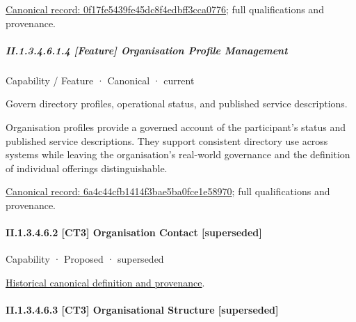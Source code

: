 {\footnotesize \href{../../../../continuum/strategy/capability/feature/0f17fe5439fe45dc8f4edbff3cca0776.md}{Canonical record: 0f17fe5439fe45dc8f4edbff3cca0776}; full qualifications and provenance.}\par
\subparagraph*{II.1.3.4.6.1.4 [Feature] Organisation Profile Management}
\label{navigation:II.1.3.4.6.1.4}

\label{element:6a4c44cfb1414f3bae5ba0fce1e58970}
{\small Capability / Feature · Canonical · current}\par

Govern directory profiles, operational status, and published service descriptions.



Organisation profiles provide a governed account of the participant's status and published service descriptions. They support consistent directory use across systems while leaving the organisation's real-world governance and the definition of individual offerings distinguishable.


{\footnotesize \href{../../../../continuum/strategy/capability/feature/6a4c44cfb1414f3bae5ba0fce1e58970.md}{Canonical record: 6a4c44cfb1414f3bae5ba0fce1e58970}; full qualifications and provenance.}\par
\paragraph*{II.1.3.4.6.2 [CT3] Organisation Contact [superseded]}
\label{navigation:II.1.3.4.6.2}

\label{element:b7f5108880eb429bb407c87a37b0e23f}
{\small Capability · Proposed · superseded}\par
\href{../../../../continuum/strategy/capability/b7f5108880eb429bb407c87a37b0e23f.md}{Historical canonical definition and provenance}.\par
\paragraph*{II.1.3.4.6.3 [CT3] Organisational Structure [superseded]}
\label{navigation:II.1.3.4.6.3}


